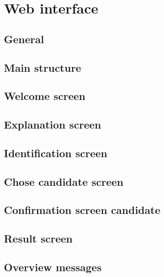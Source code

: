 \chapter{Web interface}\label{cha:web-interface}

\section{General}\label{sec10:general-10}

\section{Main structure}\label{sec10:main-structure}

\section{Welcome screen}\label{sec10:welcome-screen}

\section{Explanation screen}\label{sec10:explanation-screen}

\section{Identification screen}\label{sec10:ident-scre}

\section{Chose candidate screen}\label{sec10:chose-cand-scre}

\section{Confirmation screen candidate}\label{sec10:conf-scre-cand}

\section{Result screen}\label{sec10:result-screen}

\section{Overview messages}\label{sec10:overview-messages}

